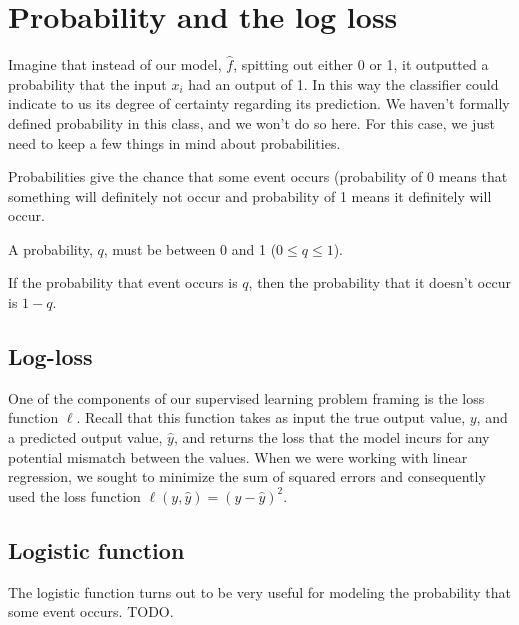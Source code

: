 \documentclass[assignment03_Solutions]{subfiles}
\begin{document}
\section{Probability and the log loss}

Imagine that instead of our model, $\hat{f}$, spitting out either 0 or 1, it outputted a probability that the input $x_i$ had an output of 1.  In this way the classifier could indicate to us its degree of certainty regarding its prediction.  We haven't formally defined probability in this class, and we won't do so here.  For this case, we just need to keep a few things in mind about probabilities.
\bi
\item Probabilities give the chance that some event occurs (probability of 0 means that something will definitely not occur and probability of 1 means it definitely will occur.
\item A probability, $q$, must be between 0 and 1 ($0 \leq q \leq 1$).
\item If the probability that event occurs is $q$, then the probability that it doesn't occur is $1 - q$.
\ei


\subsection{Log-loss}

One of the  components of our supervised learning problem framing is the loss function $\ell$.  Recall that this function takes as input the true output value, $y$, and a predicted output value, $\hat{y}$, and returns the loss that the model incurs for any potential mismatch between the values.  When we were working with linear regression, we sought to minimize the sum of squared errors and consequently used the loss function $\ell(y, \hat{y}) = (y-\hat{y})^2$.



\subsection{Logistic function}

The logistic function turns out to be very useful for modeling the probability that some event occurs.  TODO.
\end{document}
